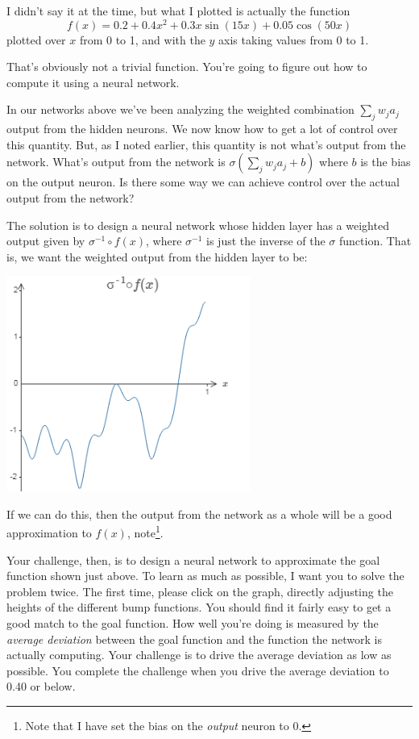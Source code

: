I didn't say it at the time, but what I plotted is actually the function 
\begin{equation}
f(x)=0.2+0.4x^2+0.3 x \sin(15x)+0.05\cos(50x)
\label{eq:wigglyequan113}
\end{equation}
plotted over $x$ from 0 to 1, and with the $y$ axis taking values from 0 to 1.

That's obviously not a trivial function.
You're going to figure out how to compute it using a neural network.

In our networks above we've been analyzing the weighted combination $\sum_j w_ja_j$
output from the hidden neurons. We now know how to get a lot of control over this quantity. But, as I noted earlier, this quantity is not what's output from the network. What's output from the network is $\sigma(\sum_j w_ja_j + b)$ where $b$
is the bias on the output neuron. Is there some way we can achieve control over the actual output from the network?

The solution is to design a neural network whose hidden layer has a weighted output given by $\sigma^{-1}\circ f(x)$, where $\sigma^{-1}$ is just the inverse of the $\sigma$
function. That is, we want the weighted output from the hidden layer to be:

{\centering \includegraphics[width=0.6\textwidth,]{pic/wigglyfn18} \par}

If we can do this, then the output from the network as a whole will be a good approximation to $f(x)$, note\footnote{Note that I have set the bias on the \textit{output} neuron to 0.}.

Your challenge, then, is to design a neural network to approximate the goal function shown just above. To learn as much as possible, I want you to solve the problem twice. The first time, please click on the graph, directly adjusting the heights of the different bump functions. You should find it fairly easy to get a good match to the goal function. How well you're doing is measured by the \textit{average deviation} between the goal function and the function the network is actually computing. Your challenge is to drive the average deviation as low as possible. You complete the challenge when you drive the average deviation to 0.40 or below.

